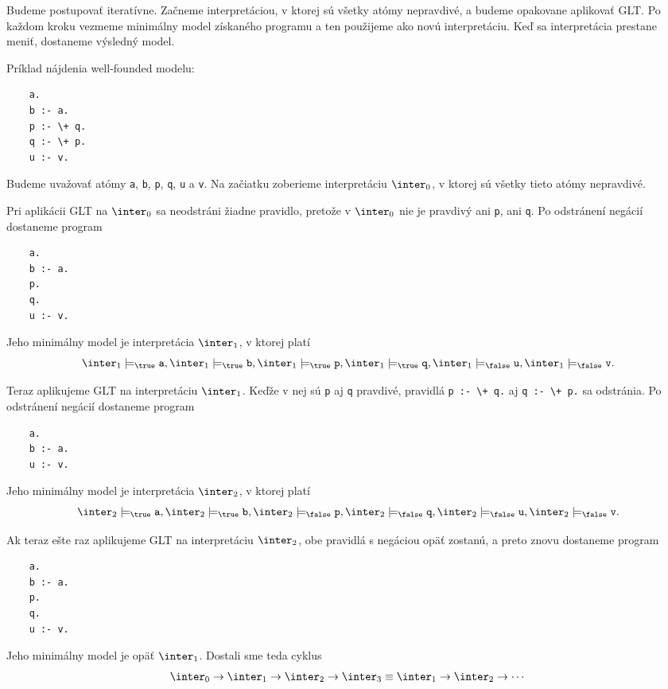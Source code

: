 Budeme postupovať iteratívne. Začneme interpretáciou, v ktorej sú všetky
atómy nepravdivé, a budeme opakovane aplikovať GLT. Po každom kroku vezmeme minimálny model
získaného programu a ten použijeme ako novú interpretáciu. Keď sa interpretácia prestane meniť,
dostaneme výsledný model.

Príklad nájdenia well-founded modelu:
\begin{verbatim}
    a.
    b :- a.
    p :- \+ q.
    q :- \+ p.
    u :- v.
\end{verbatim}

Budeme uvažovať atómy \verb|a|, \verb|b|, \verb|p|, \verb|q|, \verb|u| a \verb|v|. Na začiatku
zoberieme interpretáciu $\inter_0$, v ktorej sú všetky tieto atómy nepravdivé.

Pri aplikácii GLT na $\inter_0$ sa neodstráni žiadne pravidlo, pretože v $\inter_0$ nie je pravdivý
ani \verb|p|, ani \verb|q|. Po odstránení negácií dostaneme program
\begin{verbatim}
    a.
    b :- a.
    p.
    q.
    u :- v.
\end{verbatim}
Jeho minimálny model je interpretácia $\inter_1$, v ktorej platí
$$\inter_1 \models_\true \verb|a|, \inter_1 \models_\true \verb|b|, \inter_1 \models_\true \verb|p|,
\inter_1 \models_\true \verb|q|, \inter_1 \models_\false \verb|u|, \inter_1 \models_\false \verb|v|\text{.}$$

Teraz aplikujeme GLT na interpretáciu $\inter_1$. Keďže v nej sú \verb|p| aj \verb|q| pravdivé,
pravidlá \verb|p :- \+ q.| aj \verb|q :- \+ p.| sa odstránia. Po odstránení negácií dostaneme program
\begin{verbatim}
    a.
    b :- a.
    u :- v.
\end{verbatim}
Jeho minimálny model je interpretácia $\inter_2$, v ktorej platí
$$\inter_2 \models_\true \verb|a|, \inter_2 \models_\true \verb|b|, \inter_2 \models_\false \verb|p|,
\inter_2 \models_\false \verb|q|, \inter_2 \models_\false \verb|u|, \inter_2 \models_\false \verb|v|\text{.}$$

Ak teraz ešte raz aplikujeme GLT na interpretáciu $\inter_2$, obe pravidlá s negáciou opäť zostanú,
a preto znovu dostaneme program
\begin{verbatim}
    a.
    b :- a.
    p.
    q.
    u :- v.
\end{verbatim}
Jeho minimálny model je opäť $\inter_1$. Dostali sme teda cyklus
$$\inter_0 \rightarrow \inter_1 \rightarrow \inter_2 \rightarrow \inter_3 \equiv \inter_1 \rightarrow \inter_2 \rightarrow \cdots$$

